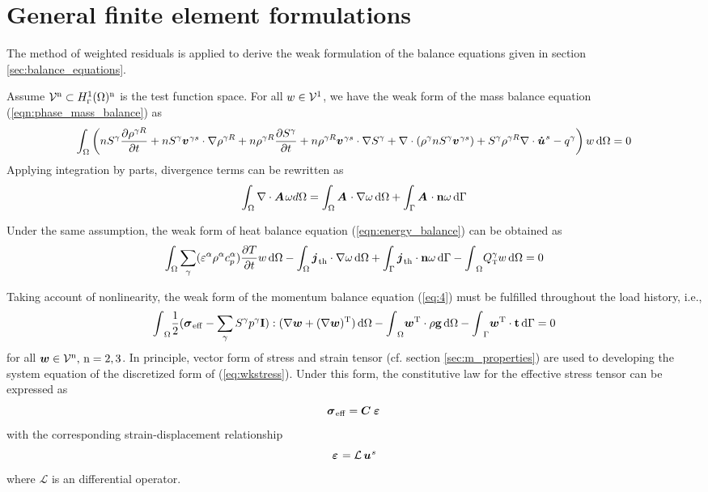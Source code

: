 \section{General finite element formulations}
\label{sec:fem}

The method of weighted residuals is applied to derive the weak
formulation of the balance equations given in section
\ref{sec:balance_equations}.

Assume $\mathcal V^{\mathrm{n}}\subset
H^1_{\scriptscriptstyle{\Gamma}}(\Omega)^{\mathrm{n}}$ is the test
function space. For all $w\in \mathcal V^{\mathrm{1}}$, we have
the weak form of the mass balance equation (\ref{eqn:phase_mass_balance}) as
%
\begin{gather}
\int_\Omega 
\left(
nS^{\gamma} \frac{\partial\rho^{\gamma R}}{\partial t} + nS^{\gamma} \mio{v}{\gamma s}{} \cdot \nabla \rho^{\gamma R}
+
n\rho^{\gamma R}\frac{\partial S^{\gamma}}{\partial t} + n\rho^{\gamma R} \mio{v}{\gamma s}{} \cdot \nabla S^{\gamma}
\nonumber  %
+
\nabla \cdot
(\rho^{\gamma}nS^{\gamma} \mio{v}{\gamma s}{} )
+S^{\gamma}\rho^{\gamma R}\nabla\cdot\mio{u}{s}{\dot} 
- q^{\gamma}
\right)
\test\dDom = 0
\label{eq:wkmass0}
\end{gather}
%
Applying integration by parts, divergence terms can be rewritten as
%
\begin{gather}
\int_\Omega \nabla\cdot\mio{A}{}{} \omega d\Omega
=
\int_\Omega \mio{A}{}{} \cdot \nabla\omega \dDom
+
\int_\Gamma \mio{A}{}{} \cdot \mathbf{n} \omega \dBdry
\label{eq:wkmass}
\end{gather}

Under the same assumption, the weak form of heat balance equation (\ref{eqn:energy_balance}) can be obtained as
\begin{gather}
\int_\Omega \sum_{\gamma}(\varepsilon^\alpha\rho^\alpha c_p^\alpha)\pD{T}{t}\test\dDom
-
\int_\Omega \miu{j}{\mathrm{th}}{} \cdot \nabla\omega \dDom
+
\int_\Gamma \miu{j}{\mathrm{th}}{} \cdot \mathbf{n} \omega \dBdry
-
\intD Q_{\mbox{\tiny T}}^{\gamma}\test\dDom=0
\label{eq:wkhTmass}
\end{gather}

Taking account of nonlinearity, the weak form of the momentum balance equation
(\ref{eq:4}) must be fulfilled throughout the load history, i.e.,
%
\begin{equation}
\intD \frac{1}{2}(\miu{\sigma}{\mathrm{eff}}{} - \sum_\gamma\sat^\gamma p^\gamma \I ):(\nabla \Test+(\nabla \Test)^{\mathrm T}) \dDom 
-
\intD\Test^{\mathrm T} \cdot \dens \grv \dDom  - \intB
\Test^{\mathrm T} \cdot {\mathbf{t}} \dBdry = 0 \label{eq:wkstress}
\end{equation}
for all $\bm w\in \mathcal V^{\mathrm{n}}, \, \mathrm{n}=2,3$.
In principle, vector form of stress and strain tensor (cf. section \ref{sec:m_properties})
are used to developing  the system equation of the discretized form of (\ref{eq:wkstress}). Under this form,
 the constitutive law for the effective stress tensor can be expressed as
\[
    \mbox{${\mbox{\boldmath${\sigma}$\unboldmath}}_{\:\!\mathrm{eff}}$} = \mbox{${\mbox{\boldmath${C}$\unboldmath}}_{\:\!}$}\, \mbox{${\mbox{\boldmath${\varepsilon}$\unboldmath}}_{\:\!}$}
\]
with the corresponding strain-displacement relationship
\[
    \mbox{${\mbox{\boldmath${\varepsilon}$\unboldmath}}_{\:\!}$} = \mathcal{L} \,\mbox{${\mbox{\boldmath${u}$\unboldmath}}^{\:\!s}$}
\]
where $\mathcal{L}$ is an differential operator.

